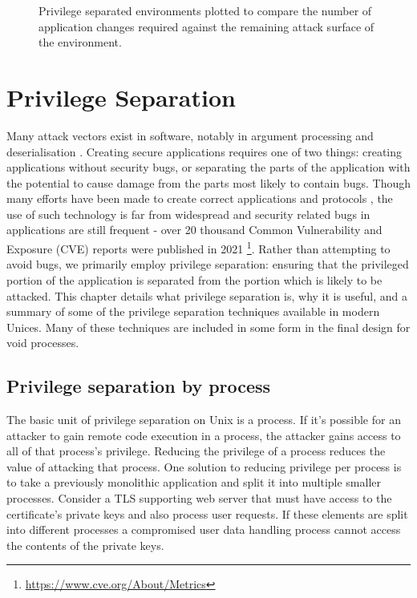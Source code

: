 \documentclass[12pt,a4paper,twoside]{report}
\begin{document}
\begin{figure}[h]
    \centering
    
    
    \caption{Privilege separated environments plotted to compare the number of application changes required against the remaining attack surface of the environment.}
    \label{fig:attack-vs-changes}
\end{figure}


\chapter{Privilege Separation}
\label{chap:priv-sep}

Many attack vectors exist in software, notably in argument processing \citep{the_mitre_corporation_improper_2006} and deserialisation \citep{the_mitre_corporation_deserialization_2006}. Creating secure applications requires one of two things: creating applications without security bugs, or separating the parts of the application with the potential to cause damage from the parts most likely to contain bugs. Though many efforts have been made to create correct applications and protocols \citep{hawblitzel_ironfleet_2015,ma_i4_2019,nelson_scaling_2019}, the use of such technology is far from widespread and security related bugs in applications are still frequent - over 20 thousand Common Vulnerability and Exposure (CVE) reports were published in 2021 \footnote{\url{https://www.cve.org/About/Metrics}}. Rather than attempting to avoid bugs, we primarily employ privilege separation: ensuring that the privileged portion of the application is separated from the portion which is likely to be attacked. This chapter details what privilege separation is, why it is useful, and a summary of some of the privilege separation techniques available in modern Unices. Many of these techniques are included in some form in the final design for void processes.

\section{Privilege separation by process}
\label{sec:priv-sep-process}

The basic unit of privilege separation on Unix is a process. If it's possible for an attacker to gain remote code execution in a process, the attacker gains access to all of that process's privilege. Reducing the privilege of a process reduces the value of attacking that process. One solution to reducing privilege per process is to take a previously monolithic application and split it into multiple smaller processes. Consider a TLS supporting web server that must have access to the certificate's private keys and also process user requests. If these elements are split into different processes a compromised user data handling process cannot access the contents of the private keys.
\end{document}
